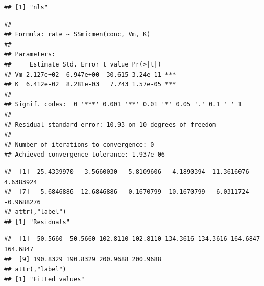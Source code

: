 \documentclass[krantz2]{krantz}\usepackage{knitr}
\begin{document}
\begin{knitrout}\footnotesize
{}\color{fgcolor}\begin{kframe}
\begin{alltt}
\end{alltt}
\begin{verbatim}
## [1] "nls"
\end{verbatim}
\begin{alltt}
\end{alltt}
\begin{verbatim}
##
## Formula: rate ~ SSmicmen(conc, Vm, K)
##
## Parameters:
##     Estimate Std. Error t value Pr(>|t|)
## Vm 2.127e+02  6.947e+00  30.615 3.24e-11 ***
## K  6.412e-02  8.281e-03   7.743 1.57e-05 ***
## ---
## Signif. codes:  0 '***' 0.001 '**' 0.01 '*' 0.05 '.' 0.1 ' ' 1
##
## Residual standard error: 10.93 on 10 degrees of freedom
##
## Number of iterations to convergence: 0
## Achieved convergence tolerance: 1.937e-06
\end{verbatim}
\begin{alltt}
\end{alltt}
\begin{verbatim}
##  [1]  25.4339970  -3.5660030  -5.8109606   4.1890394 -11.3616076   4.6383924
##  [7]  -5.6846886 -12.6846886   0.1670799  10.1670799   6.0311724  -0.9688276
## attr(,"label")
## [1] "Residuals"
\end{verbatim}
\begin{alltt}
\end{alltt}
\begin{verbatim}
##  [1]  50.5660  50.5660 102.8110 102.8110 134.3616 134.3616 164.6847 164.6847
##  [9] 190.8329 190.8329 200.9688 200.9688
## attr(,"label")
## [1] "Fitted values"
\end{verbatim}
\end{kframe}
\end{knitrout}
\end{document}
